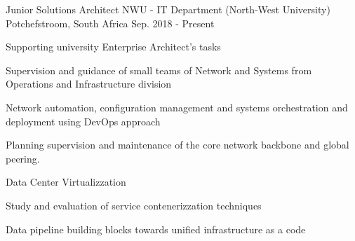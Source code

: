 


\begin{cventries}

\cventry
{Junior Solutions Architect} %
{NWU - IT Department (North-West University)} %
{Potchefstroom, South Africa} %
{Sep. 2018 - Present} %
{ %
\begin{cvitems}
\item {Supporting university Enterprise Architect's tasks}
\item {Supervision and guidance of small teams of Network and Systems from Operations and Infrastructure division}
\item {Network automation, configuration management and systems orchestration and deployment using DevOps approach}
\item {Planning supervision and maintenance of the core network backbone and global peering.}
\item {Data Center Virtualizzation}
\item {Study and evaluation of service contenerizzation techniques}
\item {Data pipeline building blocks towards unified infrastructure as a code}
\end{cvitems}
}


\end{cventries}
